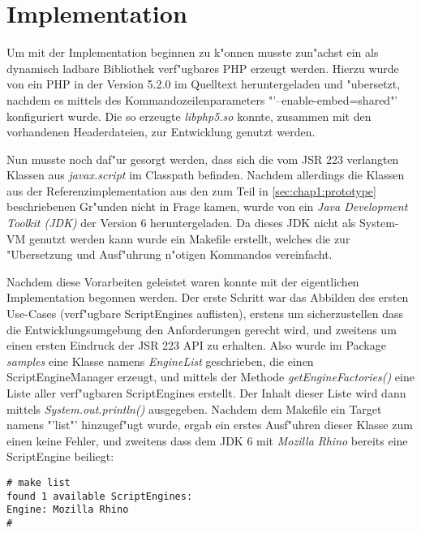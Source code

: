 
\section{Implementation}
\label{sec:chap1:impl}

Um mit der Implementation beginnen zu k"onnen musste zun"achst ein als dynamisch ladbare Bibliothek verf"ugbares
PHP erzeugt werden. Hierzu wurde von \cite{PHPHP} ein PHP in der Version 5.2.0 im Quelltext heruntergeladen und 
"ubersetzt, nachdem es mittels des Kommandozeilenparameters "'--enable-embed=shared"' konfiguriert wurde. Die so
erzeugte \emph{libphp5.so} konnte, zusammen mit den vorhandenen Headerdateien, zur Entwicklung genutzt werden.

Nun musste noch daf"ur gesorgt werden, dass sich die vom JSR 223 verlangten Klassen aus \emph{javax.script} im
Classpath befinden. Nachdem allerdings die Klassen aus der Referenzimplementation aus den zum Teil in 
\ref{sec:chap1:prototype} beschriebenen Gr"unden nicht in Frage kamen, wurde von \cite{JAVAHP} ein
\emph{Java Development Toolkit (JDK)} der Version 6 heruntergeladen. Da dieses JDK nicht als System-VM genutzt
werden kann wurde ein Makefile erstellt, welches die zur "Ubersetzung und Ausf"uhrung n"otigen Kommandos
vereinfacht.

Nachdem diese Vorarbeiten geleistet waren konnte mit der eigentlichen Implementation begonnen werden.
Der erste Schritt war das Abbilden des ersten Use-Cases (verf"ugbare ScriptEngines auflisten), erstens um 
sicherzustellen dass die Entwicklungsumgebung den Anforderungen gerecht wird, und zweitens um einen ersten
Eindruck der JSR 223 API zu erhalten. Also wurde im Package \emph{samples} eine Klasse namens
\emph{EngineList} geschrieben, die einen ScriptEngineManager erzeugt, und mittels der Methode
\emph{getEngineFactories()} eine Liste aller verf"ugbaren ScriptEngines erstellt. Der Inhalt dieser
Liste wird dann mittels \emph{System.out.println()} ausgegeben. 
Nachdem dem Makefile ein Target namens "'list"' hinzugef"ugt wurde, ergab ein erstes Ausf"uhren dieser Klasse
zum einen keine Fehler, und zweitens dass dem JDK 6 mit \emph{Mozilla Rhino} bereits eine ScriptEngine beiliegt:
\begin{lstlisting}[caption=erste Tests]
# make list
found 1 available ScriptEngines:
Engine: Mozilla Rhino
#
\end{lstlisting}

